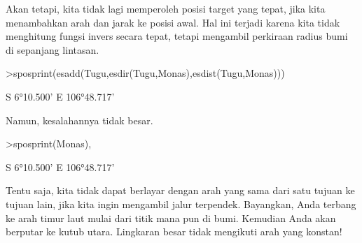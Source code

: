 \documentclass[a4paper,10pt]{article}
\begin{document}
\begin{eulernotebook}
\begin{eulercomment}
\begin{eulercomment}
\begin{eulercomment}
\begin{eulercomment}
\begin{eulercomment}
\begin{eulercomment}
\begin{eulercomment}
\begin{eulercomment}
\begin{eulercomment}
\begin{eulercomment}
\begin{eulercomment}
\begin{eulercomment}
\begin{eulercomment}
\begin{eulercomment}
\begin{eulercomment}
\begin{eulercomment}
\begin{eulercomment}
\begin{eulercomment}
\begin{eulercomment}
Akan tetapi, kita tidak lagi memperoleh posisi target yang tepat, jika
kita menambahkan arah dan jarak ke posisi awal. Hal ini terjadi karena
kita tidak menghitung fungsi invers secara tepat, tetapi mengambil
perkiraan radius bumi di sepanjang lintasan.
\end{eulercomment}
\begin{eulerprompt}
>sposprint(esadd(Tugu,esdir(Tugu,Monas),esdist(Tugu,Monas)))
\end{eulerprompt}
\begin{euleroutput}
  S 6°10.500' E 106°48.717'
\end{euleroutput}
\begin{eulercomment}
Namun, kesalahannya tidak besar.
\end{eulercomment}
\begin{eulerprompt}
>sposprint(Monas),
\end{eulerprompt}
\begin{euleroutput}
  S 6°10.500' E 106°48.717'
\end{euleroutput}
\begin{eulercomment}
Tentu saja, kita tidak dapat berlayar dengan arah yang sama dari satu
tujuan ke tujuan lain, jika kita ingin mengambil jalur terpendek.
Bayangkan, Anda terbang ke arah timur laut mulai dari titik mana pun
di bumi. Kemudian Anda akan berputar ke kutub utara. Lingkaran besar
tidak mengikuti arah yang konstan!


\end{eulercomment}
\end{eulercomment}
\end{eulercomment}
\end{eulercomment}
\end{eulercomment}
\end{eulercomment}
\end{eulercomment}
\end{eulercomment}
\end{eulercomment}
\end{eulercomment}
\end{eulercomment}
\end{eulercomment}
\end{eulercomment}
\end{eulercomment}
\end{eulercomment}
\end{eulercomment}
\end{eulercomment}
\end{eulercomment}
\end{eulercomment}
\end{eulernotebook}
\end{document}
